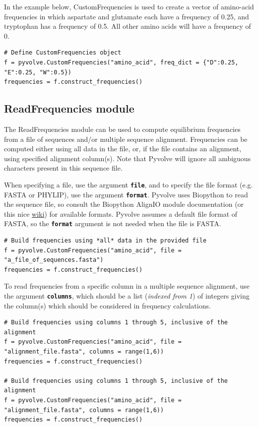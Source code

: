 \documentclass{article}
\newcommand{\code}[1]{\textbf{\texttt{\small{#1}}}}
\begin{document}
In the example below, CustomFrequencies is used to create a vector of amino-acid frequencies in which aspartate and glutamate each have a frequency of 0.25, and tryptophan has a frequency of 0.5. All other amino acids will have a frequency of 0.
\begin{lstlisting}
# Define CustomFrequencies object
f = pyvolve.CustomFrequencies("amino_acid", freq_dict = {"D":0.25, "E":0.25, "W":0.5})
frequencies = f.construct_frequencies()
\end{lstlisting}



\subsection{ReadFrequencies module}
The ReadFrequencies module can be used to compute equilibrium frequencies from a file of sequences and/or multiple sequence alignment. Frequencies can be computed either using all data in the file, or, if the file contains an alignment, using specified alignment column(s).
Note that Pyvolve will ignore all ambiguous characters present in this sequence file.

When specifying a file, use the argument \code{file}, and to specify the file format (e.g. FASTA or PHYLIP), use the argument \code{format}. Pyvolve uses Biopython to read the sequence file, so consult the Biopython AlignIO module documentation (or this nice \href{http://biopython.org/wiki/AlignIO}{wiki}) for available formats. Pyvolve assumes a default file format of FASTA, so the \code{format} argument is not needed when the file is FASTA.

\begin{lstlisting}
# Build frequencies using *all* data in the provided file
f = pyvolve.CustomFrequencies("amino_acid", file = "a_file_of_sequences.fasta")
frequencies = f.construct_frequencies()
\end{lstlisting}

To read frequencies from a specific column in a multiple sequence alignment, use the argument \code{columns}, which should be a list (\emph{indexed from 1}) of integers giving the column(s) which should be considered in frequency calculations.
\begin{lstlisting}
# Build frequencies using columns 1 through 5, inclusive of the alignment
f = pyvolve.CustomFrequencies("amino_acid", file = "alignment_file.fasta", columns = range(1,6))
frequencies = f.construct_frequencies()

# Build frequencies using columns 1 through 5, inclusive of the alignment
f = pyvolve.CustomFrequencies("amino_acid", file = "alignment_file.fasta", columns = range(1,6))
frequencies = f.construct_frequencies()

\end{lstlisting}
\end{document}
